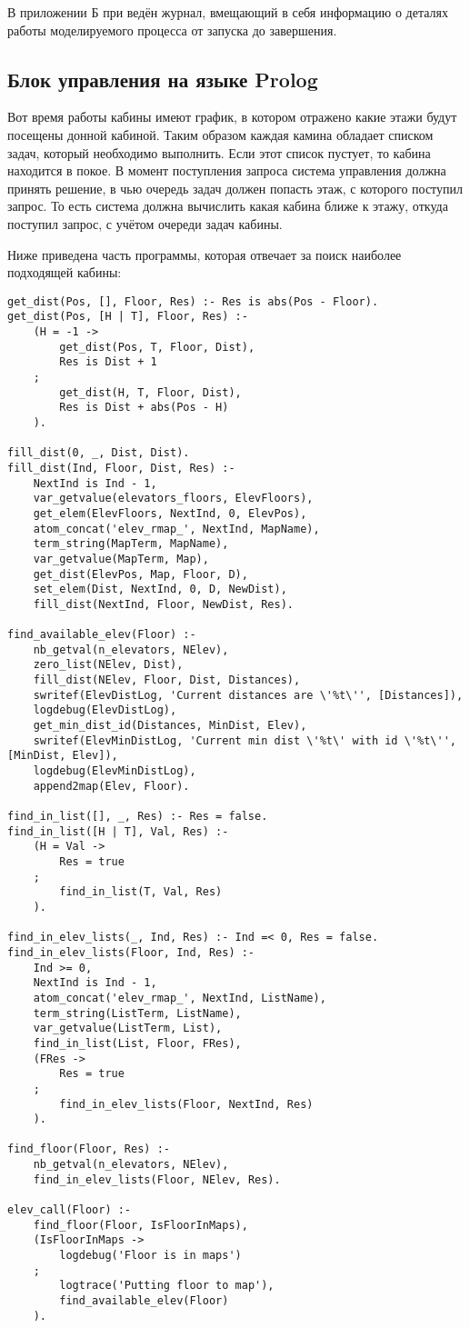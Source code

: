 	В приложении Б при ведён журнал, вмещающий в себя информацию о деталях работы моделируемого процесса от запуска
		до завершения.

	\subsection{Блок управления на языке Prolog}

		Вот время работы кабины имеют график, в котором отражено какие этажи будут посещены донной кабиной.
			Таким образом каждая камина обладает списком задач, который необходимо выполнить. Если этот
			список пустует, то кабина находится в покое.
			В момент поступления запроса система управления должна принять решение, в чью очередь задач
			должен попасть этаж, с которого поступил запрос. То есть система должна вычислить какая кабина
			ближе к этажу, откуда поступил запрос, с учётом очереди задач кабины.

		Ниже приведена часть программы, которая отвечает за поиск наиболее подходящей кабины:
\begin{lstlisting}
get_dist(Pos, [], Floor, Res) :- Res is abs(Pos - Floor).
get_dist(Pos, [H | T], Floor, Res) :-
	(H = -1 ->
		get_dist(Pos, T, Floor, Dist),
		Res is Dist + 1
	;
		get_dist(H, T, Floor, Dist),
		Res is Dist + abs(Pos - H)
	).

fill_dist(0, _, Dist, Dist).
fill_dist(Ind, Floor, Dist, Res) :-
	NextInd is Ind - 1,
	var_getvalue(elevators_floors, ElevFloors),
	get_elem(ElevFloors, NextInd, 0, ElevPos),
	atom_concat('elev_rmap_', NextInd, MapName),
	term_string(MapTerm, MapName),
	var_getvalue(MapTerm, Map),
	get_dist(ElevPos, Map, Floor, D),
	set_elem(Dist, NextInd, 0, D, NewDist),
	fill_dist(NextInd, Floor, NewDist, Res).

find_available_elev(Floor) :-
	nb_getval(n_elevators, NElev),
	zero_list(NElev, Dist),
	fill_dist(NElev, Floor, Dist, Distances),
	swritef(ElevDistLog, 'Current distances are \'%t\'', [Distances]),
	logdebug(ElevDistLog),
	get_min_dist_id(Distances, MinDist, Elev),
	swritef(ElevMinDistLog, 'Current min dist \'%t\' with id \'%t\'', [MinDist, Elev]),
	logdebug(ElevMinDistLog),
	append2map(Elev, Floor).

find_in_list([], _, Res) :- Res = false.
find_in_list([H | T], Val, Res) :-
	(H = Val ->
		Res = true
	;
		find_in_list(T, Val, Res)
	).

find_in_elev_lists(_, Ind, Res) :- Ind =< 0, Res = false.
find_in_elev_lists(Floor, Ind, Res) :-
	Ind >= 0,
	NextInd is Ind - 1,
	atom_concat('elev_rmap_', NextInd, ListName),
	term_string(ListTerm, ListName),
	var_getvalue(ListTerm, List),
	find_in_list(List, Floor, FRes),
	(FRes ->
		Res = true
	;
		find_in_elev_lists(Floor, NextInd, Res)
	).

find_floor(Floor, Res) :-
	nb_getval(n_elevators, NElev),
	find_in_elev_lists(Floor, NElev, Res).

elev_call(Floor) :-
	find_floor(Floor, IsFloorInMaps),
	(IsFloorInMaps ->
		logdebug('Floor is in maps')
	;
		logtrace('Putting floor to map'),
		find_available_elev(Floor)
	).
\end{lstlisting}

